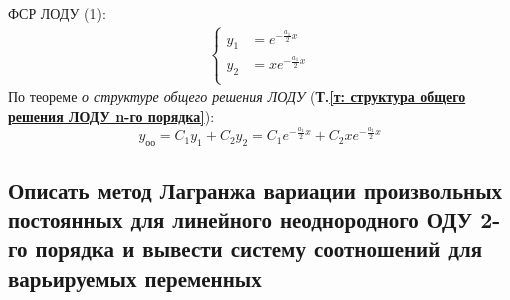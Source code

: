 ФСР ЛОДУ (1):
\begin{gather*}
    \left\{ \begin{aligned}
        y_1 &= e^{-\tfrac{a_1}{2}x} \\
        y_2 &= xe^{-\tfrac{a_1}{2}x} \\
    \end{aligned} \right.
\end{gather*}
По теореме \textit{о структуре общего решения ЛОДУ} (\textbf{Т.\ref{т: структура общего решения ЛОДУ n-го порядка}}):
\[
    y_{\text{оо}} = C_1y_1 + C_2y_2 = C_1 e^{-\tfrac{a_1}{2}x} + C_2 xe^{-\tfrac{a_1}{2}x}
\]

\subsection{Описать метод Лагранжа вариации произвольных постоянных для линейного неоднородного ОДУ 2-го порядка и вывести систему соотношений для варьируемых переменных}

